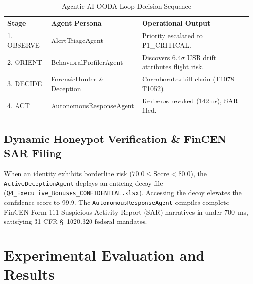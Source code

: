 \documentclass[conference]{IEEEtran}
\begin{document}
\begin{table}[htbp]
\caption{Agentic AI OODA Loop Decision Sequence}
\begin{center}
\begin{tabular}{lll}
\toprule
\textbf{Stage} & \textbf{Agent Persona} & \textbf{Operational Output} \\
\midrule
1. OBSERVE & AlertTriageAgent & Priority escalated to P1\_CRITICAL. \\
2. ORIENT & BehavioralProfilerAgent & Discovers 6.4$\sigma$ USB drift; attributes flight risk. \\
3. DECIDE & ForensicHunter \& Deception & Corroborates kill-chain (T1078, T1052). \\
4. ACT & AutonomousResponseAgent & Kerberos revoked (142ms), SAR filed. \\
\bottomrule
\end{tabular}
\end{center}
\label{tab:ooda}
\end{table}

\subsection{Dynamic Honeypot Verification \& FinCEN SAR Filing}
When an identity exhibits borderline risk ($70.0 \le \text{Score} < 80.0$), the \texttt{ActiveDeceptionAgent} deploys an enticing decoy file (\texttt{Q4\_Executive\_Bonuses\_CONFIDENTIAL.xlsx}). Accessing the decoy elevates the confidence score to 99.9. The \texttt{AutonomousResponseAgent} compiles complete FinCEN Form 111 Suspicious Activity Report (SAR) narratives in under 700~ms, satisfying 31 CFR \S~1020.320 federal mandates.

\section{Experimental Evaluation and Results}

\begin{table}[htbp]
\caption{Comparative Detection Performance Across Attack Archetypes}
\begin{center}
\end{center}
\label{tab:benchmarks}
\end{table}
\end{document}
